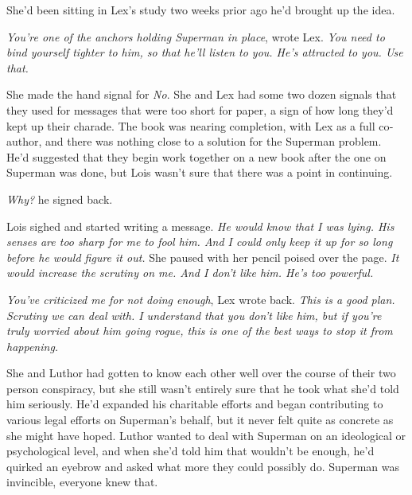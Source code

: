 She'd been sitting in Lex's study two weeks prior ago he'd brought up
the idea.

\emph{You're one of the anchors holding Superman in place}, wrote Lex.
\emph{You need to bind yourself tighter to him, so that he'll listen to
you. He's attracted to you. Use that.}

She made the hand signal for \emph{No}. She and Lex had some two dozen
signals that they used for messages that were too short for paper, a
sign of how long they'd kept up their charade. The book was nearing
completion, with Lex as a full co‐author, and there was nothing close to
a solution for the Superman problem. He'd suggested that they begin work
together on a new book after the one on Superman was done, but Lois
wasn't sure that there was a point in continuing.

\emph{Why?} he signed back.

Lois sighed and started writing a message. \emph{He would know that I
was lying. His senses are too sharp for me to fool him. And I could only
keep it up for so long before he would figure it out.} She paused with
her pencil poised over the page. \emph{It would increase the scrutiny on
me. And I don't like him. He's too powerful.}

\emph{You've criticized me for not doing enough}, Lex wrote back.
\emph{This is a good plan. Scrutiny we can deal with. I understand that
you don't like him, but if you're truly worried about him going rogue,
this is one of the best ways to stop it from happening.}

She and Luthor had gotten to know each other well over the course of
their two person conspiracy, but she still wasn't entirely sure that he
took what she'd told him seriously. He'd expanded his charitable efforts
and began contributing to various legal efforts on Superman's behalf,
but it never felt quite as concrete as she might have hoped. Luthor
wanted to deal with Superman on an ideological or psychological level,
and when she'd told him that wouldn't be enough, he'd quirked an eyebrow
and asked what more they could possibly do. Superman was invincible,
everyone knew that.


